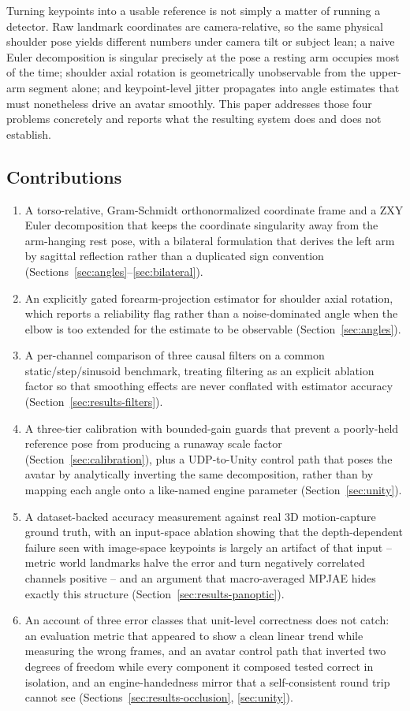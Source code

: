 \documentclass[conference]{IEEEtran}
\begin{document}
Turning keypoints into a usable reference is not simply a matter of
running a detector. Raw landmark coordinates are camera-relative, so the
same physical shoulder pose yields different numbers under camera tilt or
subject lean; a naive Euler decomposition is singular precisely at the
pose a resting arm occupies most of the time; shoulder axial rotation is
geometrically unobservable from the upper-arm segment alone; and
keypoint-level jitter propagates into angle estimates that must
nonetheless drive an avatar smoothly. This paper addresses those four
problems concretely and reports what the resulting system does and does
not establish.

\subsection{Contributions}
\begin{enumerate}
\item A torso-relative, Gram-Schmidt orthonormalized coordinate frame and
a ZXY Euler decomposition that keeps the coordinate singularity away from
the arm-hanging rest pose, with a bilateral formulation that derives the
left arm by sagittal reflection rather than a duplicated sign convention
(Sections~\ref{sec:angles}--\ref{sec:bilateral}).
\item An explicitly gated forearm-projection estimator for shoulder axial
rotation, which reports a reliability flag rather than a noise-dominated
angle when the elbow is too extended for the estimate to be observable
(Section~\ref{sec:angles}).
\item A per-channel comparison of three causal filters on a common
static/step/sinusoid benchmark, treating filtering as an explicit
ablation factor so that smoothing effects are never conflated with
estimator accuracy (Section~\ref{sec:results-filters}).
\item A three-tier calibration with bounded-gain guards that prevent a
poorly-held reference pose from producing a runaway scale factor
(Section~\ref{sec:calibration}), plus a UDP-to-Unity control path that
poses the avatar by analytically inverting the same decomposition, rather
than by mapping each angle onto a like-named engine parameter
(Section~\ref{sec:unity}).
\item A dataset-backed accuracy measurement against real 3D
motion-capture ground truth, with an input-space ablation showing that
the depth-dependent failure seen with image-space keypoints is largely an
artifact of that input -- metric world landmarks halve the error and turn
negatively correlated channels positive -- and an argument that
macro-averaged MPJAE hides exactly this structure
(Section~\ref{sec:results-panoptic}).
\item An account of three error classes that unit-level correctness does
not catch: an evaluation metric that appeared to show a clean linear
trend while measuring the wrong frames, and an avatar control path that
inverted two degrees of freedom while every component it composed tested
correct in isolation, and an engine-handedness mirror that a
self-consistent round trip cannot see (Sections~\ref{sec:results-occlusion},
\ref{sec:unity}).
\end{enumerate}
\end{document}
